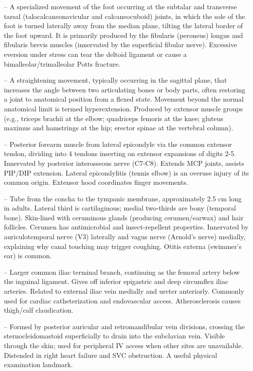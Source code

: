 -- A specialized movement of the foot occurring at the subtalar and transverse tarsal (talocalcaneonavicular and calcaneocuboid) joints, in which the sole of the foot is turned laterally away from the median plane, tilting the lateral border of the foot upward. It is primarily produced by the fibularis (peroneus) longus and fibularis brevis muscles (innervated by the superficial fibular nerve). Excessive eversion under stress can tear the deltoid ligament or cause a bimalleolar/trimalleolar Potts fracture.

-- A straightening movement, typically occurring in the sagittal plane, that increases the angle between two articulating bones or body parts, often restoring a joint to anatomical position from a flexed state. Movement beyond the normal anatomical limit is termed hyperextension. Produced by extensor muscle groups (e.g., triceps brachii at the elbow; quadriceps femoris at the knee; gluteus maximus and hamstrings at the hip; erector spinae at the vertebral column).

-- Posterior forearm muscle from lateral epicondyle via the common extensor tendon, dividing into 4 tendons inserting on extensor expansions of digits 2-5. Innervated by posterior interosseous nerve (C7-C8). Extends MCP joints, assists PIP/DIP extension. Lateral epicondylitis (tennis elbow) is an overuse injury of its common origin. Extensor hood coordinates finger movements.

-- Tube from the concha to the tympanic membrane, approximately 2.5 cm long in adults. Lateral third is cartilaginous; medial two-thirds are bony (temporal bone). Skin-lined with ceruminous glands (producing cerumen/earwax) and hair follicles. Cerumen has antimicrobial and insect-repellent properties. Innervated by auriculotemporal nerve (V3) laterally and vagus nerve (Arnold's nerve) medially, explaining why canal touching may trigger coughing. Otitis externa (swimmer's ear) is common.

-- Larger common iliac terminal branch, continuing as the femoral artery below the inguinal ligament. Gives off inferior epigastric and deep circumflex iliac arteries. Related to external iliac vein medially and ureter anteriorly. Commonly used for cardiac catheterization and endovascular access. Atherosclerosis causes thigh/calf claudication.

-- Formed by posterior auricular and retromandibular vein divisions, crossing the sternocleidomastoid superficially to drain into the subclavian vein. Visible through the skin; used for peripheral IV access when other sites are unavailable. Distended in right heart failure and SVC obstruction. A useful physical examination landmark.

